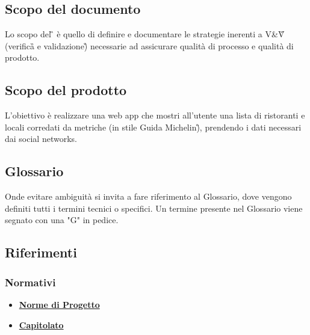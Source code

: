\subsection{Scopo del documento}
Lo scopo del \PdQ{}\G{} è quello di definire e documentare le strategie inerenti a V\&V\G{} (verifica\G{}
e validazione\G) necessarie ad assicurare qualità di processo e qualità di prodotto.

\subsection{Scopo del prodotto}
L'obiettivo è realizzare una web app che mostri all'utente una lista di ristoranti e locali 
corredati da metriche (in stile Guida Michelin\G), prendendo i dati necessari dai social networks.

\subsection{Glossario}
Onde evitare ambiguità si invita a fare riferimento al Glossario, dove vengono definiti tutti 
i termini tecnici o specifici. Un termine presente nel Glossario viene segnato con una "G" in pedice.

\subsection{Riferimenti}
\subsubsection{Normativi}
\begin{itemize}
    \item \href{https://github.com/Bug-s-Bunny-Team/docs/tree/master/src/Interni/Norme_Di_Progetto}{\textbf{Norme di Progetto}}
    \item \href{https://www.math.unipd.it/~tullio/IS-1/2021/Progetto/C4p.pdf}{\textbf{Capitolato}}
\end{itemize}

